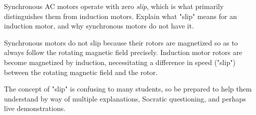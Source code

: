 

Synchronous AC motors operate with zero {\it slip}, which is what primarily distinguishes them from induction motors.  Explain what "slip" means for an induction motor, and why synchronous motors do not have it.







Synchronous motors do not slip because their rotors are magnetized so as to always follow the rotating magnetic field precisely.  Induction motor rotors are become magnetized by induction, necessitating a difference in speed ("slip") between the rotating magnetic field and the rotor.







The concept of "slip" is confusing to many students, so be prepared to help them understand by way of multiple explanations, Socratic questioning, and perhaps live demonstrations.




